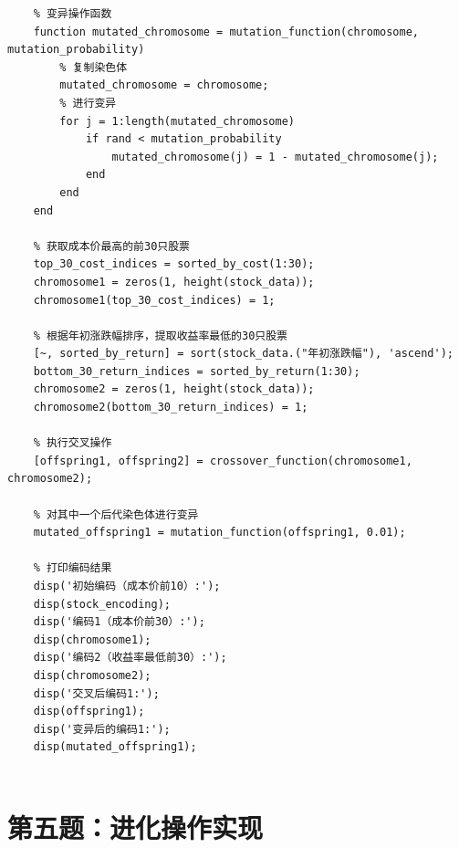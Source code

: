 \documentclass[journal,twoside,web]{ieeecolor}
\begin{document}
\begin{lstlisting}
    % 变异操作函数
    function mutated_chromosome = mutation_function(chromosome, mutation_probability)
        % 复制染色体
        mutated_chromosome = chromosome;
        % 进行变异
        for j = 1:length(mutated_chromosome)
            if rand < mutation_probability
                mutated_chromosome(j) = 1 - mutated_chromosome(j);
            end
        end
    end
    
    % 获取成本价最高的前30只股票
    top_30_cost_indices = sorted_by_cost(1:30);
    chromosome1 = zeros(1, height(stock_data));
    chromosome1(top_30_cost_indices) = 1;
    
    % 根据年初涨跌幅排序，提取收益率最低的30只股票
    [~, sorted_by_return] = sort(stock_data.("年初涨跌幅"), 'ascend');
    bottom_30_return_indices = sorted_by_return(1:30);
    chromosome2 = zeros(1, height(stock_data));
    chromosome2(bottom_30_return_indices) = 1;
    
    % 执行交叉操作
    [offspring1, offspring2] = crossover_function(chromosome1, chromosome2);
    
    % 对其中一个后代染色体进行变异
    mutated_offspring1 = mutation_function(offspring1, 0.01);
    
    % 打印编码结果
    disp('初始编码（成本价前10）:');
    disp(stock_encoding);
    disp('编码1（成本价前30）:');
    disp(chromosome1);
    disp('编码2（收益率最低前30）:');
    disp(chromosome2);
    disp('交叉后编码1:');
    disp(offspring1);
    disp('变异后的编码1:');
    disp(mutated_offspring1);
    
\end{lstlisting}
\section{第五题：进化操作实现}
\end{document}
